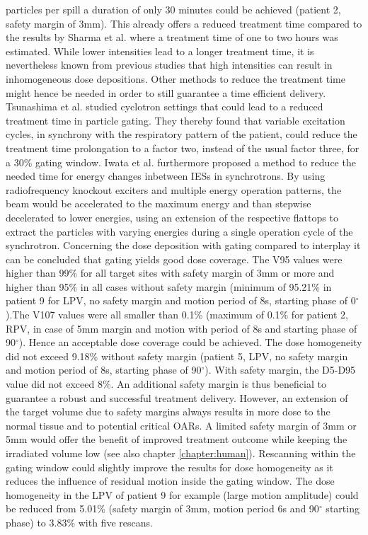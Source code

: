 particles per spill a duration of only 30 minutes could be achieved (patient 2, safety margin of 3mm). This already offers a reduced 
treatment time compared to the results by Sharma et al. where a treatment time of one to two hours was estimated. 
While lower intensities lead to a longer treatment time, it is nevertheless known from previous studies \cite{Mue14} that high intensities 
can result in inhomogeneous dose depositions. Other methods to reduce the treatment time might hence be needed in order to still guarantee a time 
efficient delivery. Tsunashima et al. \cite{Tsu08} studied cyclotron settings that could lead to a reduced treatment time in particle gating. 
They thereby found that variable excitation cycles, in synchrony with the respiratory pattern of the patient, could reduce the treatment time 
prolongation to a factor two, instead of the usual factor three, for a 30\% gating window. 
Iwata et al. \cite{Iwa10b} furthermore proposed a method to reduce the needed time for energy changes inbetween IESs in synchrotrons. 
By using radiofrequency knockout exciters and multiple energy operation patterns, the beam would be accelerated to the maximum energy and than 
stepwise decelerated to lower energies, using an extension of the respective flattops to extract the particles with varying energies during a 
single operation cycle of the synchrotron.\newline
\newline
Concerning the dose deposition with gating compared to interplay it can be concluded that gating yields good dose coverage. The V95 values 
were higher than 99\% for all target sites with safety margin of 3mm or more and higher than 95\% in all cases without safety margin (minimum of 
95.21\% in patient 9 for LPV, no safety margin and motion period of 8s, starting phase of 0$^{\circ}$).The V107 values were all smaller 
than 0.1\% (maximum of 0.1\% for patient 2, RPV, in case of 5mm margin and motion with period of 8s and starting phase of 90$^{\circ}$). 
Hence an acceptable dose coverage could be achieved. The dose homogeneity did not exceed 9.18\% without safety margin (patient 5, LPV, no 
safety margin and motion period of 8s, starting phase of 90$^{\circ}$). With safety margin, the D5-D95 value did not exceed 8\%. An additional 
safety margin is thus beneficial to guarantee a robust and successful treatment delivery. However, an extension of the target volume due to 
safety margins always results in more dose to the normal tissue and to potential critical OARs. A limited safety margin of 3mm or 5mm would 
offer the benefit of improved treatment outcome while keeping the irradiated volume low (see also chapter \ref{chapter:human}).\newline
\newline
Rescanning within the gating window could slightly improve the results for dose homogeneity as it reduces the influence of residual motion 
inside the gating window. The dose homogeneity in the LPV of patient 9 for example (large motion amplitude) could be reduced from 5.01\%  
(safety margin of 3mm, motion period 6s and 90$^{\circ}$ starting phase) to 3.83\% with five rescans. 


